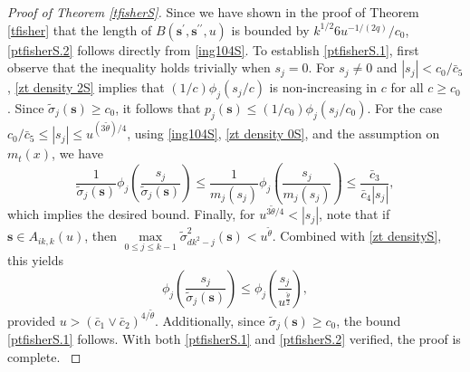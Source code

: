 \documentclass[ejsv2]{imsart}
\theoremstyle{plain}
\theoremstyle{definition}
\theoremstyle{remark}
\begin{document}
\begin{appendix}
\begin{proof}[Proof of Theorem \ref{tfisherS}]
{ 
 Since we have shown in the proof of 
 Theorem \ref{tfisher} that the length of $B(\mathbf{s}^{\prime},\mathbf{s}^{\prime\prime},u)$ is bounded by $k^{1/2}6u^{-1/(2q)}/c_0$,
\eqref{ptfisherS.2} follows directly from
\eqref{ing104S}.
To establish
\eqref{ptfisherS.1}, first observe that the inequality holds trivially 
when $s_j=0$.
For $s_j \neq 0$ and
$|s_j|<c_0/\bar{c}_5$, \eqref{zt density 2S} implies that $(1/c)\phi_j(s_j/c)$ is non-increasing in $c$ for all $c\geq c_0$. Since $\tilde{\sigma}_j(\mathbf{s})\geq c_0$, it follows that $p_j(\mathbf{s})\leq(1/c_0)\phi_j(s_j/c_0)$. For the case $c_0/\bar{c}_5\leq|s_j|\leq u^{(3\tilde{\theta})/4}$, using \eqref{ing104S}, \eqref{zt density 0S}, and the assumption on $m_t(x)$, we have 
\begin{equation*}\label{ptfisherS.3}
\frac{1}{\tilde{\sigma}_j(\mathbf{s})}\phi_j(\frac{s_j}{\tilde{\sigma}_j(\mathbf{s})})\leq \frac{1}{m_j(s_j)}\phi_j(\frac{s_j}{m_j(s_j)})\leq \frac{\bar{c}_3}{\bar{c}_4|s_j|},
\end{equation*}
which implies the desired bound. Finally, for $u^{3\tilde{\theta}/4}<|s_j|$, note that if $\mathbf{s}\in A_{ik,k}(u)$, then $\max\limits_{0\leq j\leq k-1}\tilde{\sigma}^2_{dk^2-j}(\mathbf{s})<u^{\tilde{\theta}}$. 
Combined with \eqref{zt densityS}, this yields
\begin{equation*}\label{ptfisherS.4}
\phi_j(\frac{s_j}{\tilde{\sigma}_j(\mathbf{s})})\leq \phi_j(\frac{s_j}{u^{\frac{\tilde{\theta}}{2}}}),
\end{equation*}
provided $u> (\bar{c}_1\vee\bar{c}_2)^{4/\tilde{\theta}}$.
Additionally, since $\tilde{\sigma}_j(\mathbf{s})\geq c_0$,
the bound
\eqref{ptfisherS.1} follows.
With both 
\eqref{ptfisherS.1} and \eqref{ptfisherS.2} verified,
the proof is complete.
}
\end{proof}


\end{appendix}
\end{document}
